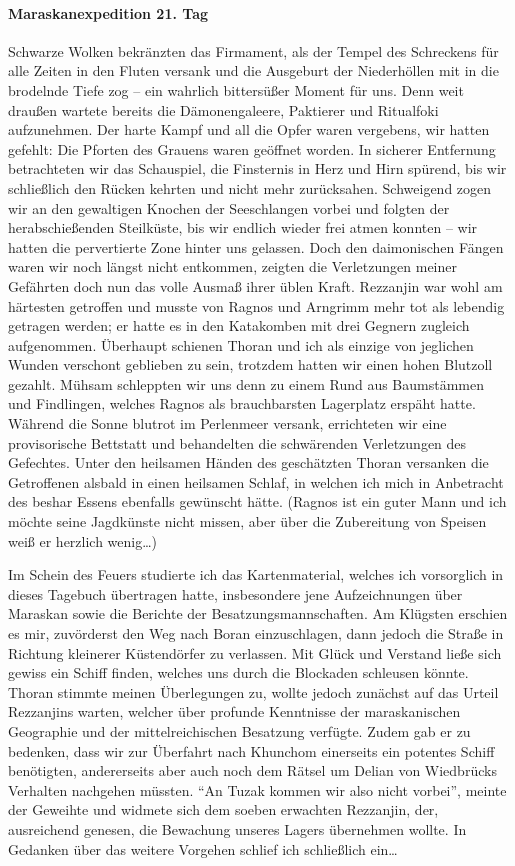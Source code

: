 \paragraph{Maraskanexpedition 21. Tag}
Schwarze Wolken bekränzten das Firmament, als der Tempel des Schreckens für alle Zeiten in den Fluten versank und die Ausgeburt der Niederhöllen mit in die brodelnde Tiefe zog -- ein wahrlich bittersüßer Moment für uns. Denn weit draußen wartete bereits die Dämonengaleere, Paktierer und Ritualfoki aufzunehmen. Der harte Kampf und all die Opfer waren vergebens, wir hatten gefehlt: Die Pforten des Grauens waren geöffnet worden. In sicherer Entfernung betrachteten wir das Schauspiel, die Finsternis in Herz und Hirn spürend, bis wir schließlich den Rücken kehrten und nicht mehr zurücksahen. Schweigend zogen wir an den gewaltigen Knochen der Seeschlangen vorbei und folgten der herabschießenden Steilküste, bis wir endlich wieder frei atmen konnten -- wir hatten die pervertierte Zone hinter uns gelassen. Doch den daimonischen Fängen waren wir noch längst nicht entkommen, zeigten die Verletzungen meiner Gefährten doch nun das volle Ausmaß ihrer üblen Kraft. Rezzanjin war wohl am härtesten getroffen und musste von Ragnos und Arngrimm mehr tot als lebendig getragen werden; er hatte es in den Katakomben mit drei Gegnern zugleich aufgenommen. Überhaupt schienen Thoran und ich als einzige von jeglichen Wunden verschont geblieben zu sein, trotzdem hatten wir einen hohen Blutzoll gezahlt. Mühsam schleppten wir uns denn zu einem Rund aus Baumstämmen und Findlingen, welches Ragnos als brauchbarsten Lagerplatz erspäht hatte. Während die Sonne blutrot im Perlenmeer versank, errichteten wir eine provisorische Bettstatt und behandelten die schwärenden Verletzungen des Gefechtes. Unter den heilsamen Händen des geschätzten Thoran versanken die Getroffenen alsbald in einen heilsamen Schlaf, in welchen ich mich in Anbetracht des beshar Essens ebenfalls gewünscht hätte. (Ragnos ist ein guter Mann und ich möchte seine Jagdkünste nicht missen, aber über die Zubereitung von Speisen weiß er herzlich wenig…)

Im Schein des Feuers studierte ich das Kartenmaterial, welches ich vorsorglich in dieses Tagebuch übertragen hatte, insbesondere jene Aufzeichnungen über Maraskan sowie die Berichte der Besatzungsmannschaften. Am Klügsten erschien es mir, zuvörderst den Weg nach Boran einzuschlagen, dann jedoch die Straße in Richtung kleinerer Küstendörfer zu verlassen. Mit Glück und Verstand ließe sich gewiss ein Schiff finden, welches uns durch die Blockaden schleusen könnte. Thoran stimmte meinen Überlegungen zu, wollte jedoch zunächst auf das Urteil Rezzanjins warten, welcher über profunde Kenntnisse der maraskanischen Geographie und der mittelreichischen Besatzung verfügte. Zudem gab er zu bedenken, dass wir zur Überfahrt nach Khunchom einerseits ein potentes Schiff benötigten, andererseits aber auch noch dem Rätsel um Delian von Wiedbrücks Verhalten nachgehen müssten. ``An Tuzak kommen wir also nicht vorbei'', meinte der Geweihte und widmete sich dem soeben erwachten Rezzanjin, der, ausreichend genesen, die Bewachung unseres Lagers übernehmen wollte. In Gedanken über das weitere Vorgehen schlief ich schließlich ein…

